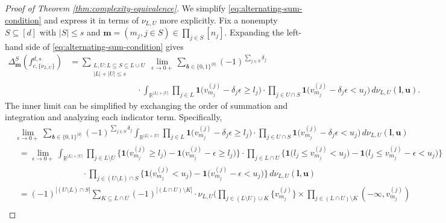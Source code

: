 \documentclass[10pt]{article}
\newcommand{\R}{{\mathbb R}}
\newcommand{\fcnu}{{f^{d, s}_{c, \{\nu_{L, U}\}}}}
\newcommand{\lbf}{{\mathbf{l}}}
\newcommand{\ubf}{{\mathbf{u}}}
\newcommand{\mbf}{{\mathbf{m}}}
\newcommand{\deltabf}{{\boldsymbol{\delta}}}
\newcommand{\ind}{{\mathbf{1}}}
\begin{document}
\begin{proof}[Proof of Theorem \ref{thm:complexity-equivalence}]
    
We simplify \eqref{eq:alternating-sum-condition} and express it 
in terms of $\nu_{L, U}$ more explicitly. 
Fix a nonempty $S \subseteq [d]$ with $|S| \le s$ and 
$\mbf = (m_j, j \in S) \in \prod_{j \in S} [n_j]$.
Expanding the left-hand side of \eqref{eq:alternating-sum-condition} gives
\begingroup
\allowdisplaybreaks
\begin{align}\label{eq:alternating-sum-expansion}
    \Delta^S_{\mbf}(\fcnu) 
    &= \sum_{\substack{L, U: L \subseteq S \subseteq L \cup U 
    \\ |L| + |U| \le s}}
    \lim_{\epsilon \to 0+}
    \sum_{\deltabf \in \{0, 1\}^{|S|}} (-1)^{\sum_{j \in S} \delta_j} \\
    &\qquad \qquad \qquad \qquad
    \cdot \int_{\R^{|L| + |U|}} \prod_{j \in L} 
    \ind\big(v^{(j)}_{m_j} - \delta_j \epsilon \ge l_j\big)
    \cdot \prod_{j \in U \cap S} 
    \ind\big(v^{(j)}_{m_j} - \delta_j \epsilon < u_j\big) 
    \, d\nu_{L, U}(\lbf, \ubf). \nonumber
\end{align}
\endgroup
The inner limit can be simplified by exchanging the order of summation and 
integration and analyzing each indicator term. Specifically, 
\begin{equation*}
\begin{aligned}
    &\lim_{\epsilon \to 0+}
    \sum_{\deltabf \in \{0, 1\}^{|S|}} (-1)^{\sum_{j \in S} \delta_j} 
    \int_{\R^{|L| + |U|}} \prod_{j \in L} 
    \ind\big(v^{(j)}_{m_j} - \delta_j \epsilon \ge l_j\big)
    \cdot \prod_{j \in U \cap S} 
    \ind\big(v^{(j)}_{m_j} - \delta_j \epsilon < u_j\big) 
    \, d\nu_{L, U}(\lbf, \ubf) \\
    &\ \ = \lim_{\epsilon \to 0+}
    \int_{\R^{|L| + |U|}} \prod_{j \in L \setminus U} \big\{
    \ind\big(v^{(j)}_{m_j} \ge l_j \big)
    - \ind\big(v^{(j)}_{m_j} - \epsilon \ge l_j\big)\big\} \cdot \prod_{j \in L \cap U} \big\{
    \ind\big(l_j \le v^{(j)}_{m_j} < u_j \big)
    - \ind\big(l_j \le v^{(j)}_{m_j} 
    - \epsilon < u_j\big)\big\} \\
    &\qquad \qquad \qquad \qquad 
    \cdot \prod_{j \in (U \setminus L) \cap S} \big\{
    \ind\big(v^{(j)}_{m_j} < u_j \big)
    - \ind\big(v^{(j)}_{m_j} - \epsilon < u_j\big)\big\}
    \, d\nu_{L, U}(\lbf, \ubf) \\
    &\ \ = (-1)^{|(U \setminus L) \cap S|} 
    \sum_{K \subseteq L \cap U} (-1)^{|(L \cap U) \setminus K|} \cdot 
    \nu_{L, U} \Big(\prod_{j \in (L \setminus U) \cup K} 
    \{v^{(j)}_{m_j}\} \times \prod_{j \in (L \cap U) \setminus K} 
    (-\infty, v^{(j)}_{m_j}) \\

\end{aligned}
\end{equation*}
\end{proof}
\end{document}
